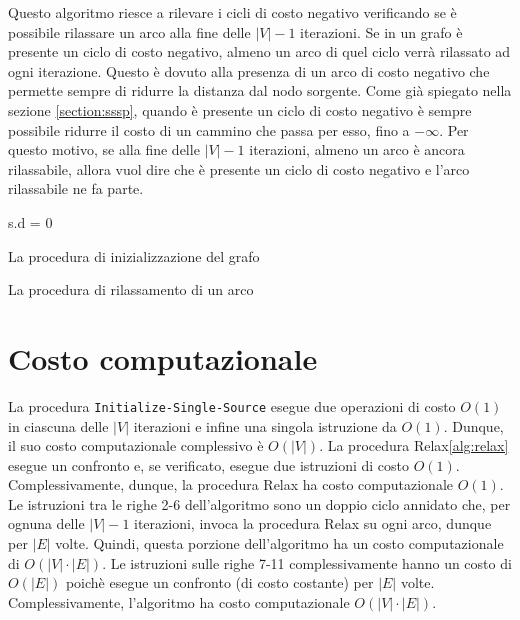 \documentclass[12pt,a4paper]{book}
\begin{document}
	Questo algoritmo riesce a rilevare i cicli di costo negativo verificando se è possibile rilassare un arco alla fine delle $|V|-1$ iterazioni. Se in un grafo è presente un ciclo di costo negativo, almeno un arco di quel ciclo verrà rilassato ad ogni iterazione. Questo è dovuto alla presenza di un arco di costo negativo che permette sempre di ridurre la distanza dal nodo sorgente. Come già spiegato nella sezione \ref{section:sssp}, quando è presente un ciclo di costo negativo è sempre possibile ridurre il costo di un cammino che passa per esso, fino a $-\infty$. Per questo motivo, se alla fine delle $|V|-1$ iterazioni, almeno un arco è ancora rilassabile, allora vuol dire che è presente un ciclo di costo negativo e l'arco rilassabile ne fa parte.

	\begin{algorithm}[H]
		\label{alg:init}
		s.d = 0\;
		\caption{La procedura di inizializzazione del grafo}
	\end{algorithm}

	\begin{algorithm}[H]
		\label{alg:relax}
		\caption{La procedura di rilassamento di un arco}
	\end{algorithm}

	\section{Costo computazionale}
	La procedura \texttt{Initialize-Single-Source} esegue due operazioni di costo $O(1)$ in ciascuna delle $|V|$ iterazioni e infine una singola istruzione da $O(1)$. Dunque, il suo costo computazionale complessivo è $O(|V|)$. La procedura Relax\ref{alg:relax} esegue un confronto e, se verificato, esegue due istruzioni di costo $O(1)$. Complessivamente, dunque, la procedura Relax ha costo computazionale $O(1)$. Le istruzioni tra le righe 2-6 dell'algoritmo sono un doppio ciclo annidato che, per ognuna delle $|V|-1$ iterazioni, invoca la procedura Relax su ogni arco, dunque per $|E|$ volte. Quindi, questa porzione dell'algoritmo ha un costo computazionale di $O(|V|\cdot |E|)$. Le istruzioni sulle righe 7-11 complessivamente hanno un costo di $O(|E|)$ poichè esegue un confronto (di costo costante) per $|E|$ volte. Complessivamente, l'algoritmo ha costo computazionale $O(|V|\cdot |E|)$.
	
\end{document}
